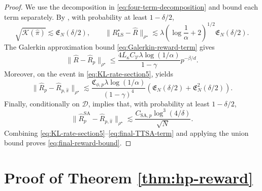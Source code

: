 \documentclass{article}
\theoremstyle{definition}
\theoremstyle{remark}
\theoremstyle{plain}
\newcommand{\dsieve}{p}
\numberwithin{equation}{section}
\begin{document}
\begin{proof}
We use the decomposition in \eqref{eq:four-term-decomposition} and bound each term separately.
By , with probability at least \(1-\delta/2\),
\begin{equation}
\label{eq:KL-rate-section5}
    \sqrt{\mathcal K(\widehat\pi)}
    \lesssim
    \mathfrak E_N(\delta/2),
    \qquad
    \|R_{\mathrm{LS}}^\star-\widehat R\|_{\rho^\star}
    \lesssim
    \lambda
    \left(\log\frac1\alpha+2\right)^{1/2}
    \mathfrak E_N(\delta/2).
\end{equation}
The Galerkin approximation bound \eqref{eq:Galerkin-reward-term} gives
\begin{equation}
\label{eq:final-Galerkin-term}
    \|\widehat R-\widehat R_\dsieve\|_{\rho^\star}
    \leq
    \frac{
        4L_{\kappa} C_{\mathcal V}
        \lambda\log(1/\alpha)
    }{1-\gamma}
    \dsieve^{-\beta/d}.
\end{equation}
Moreover, on the event in \eqref{eq:KL-rate-section5},
 yields
\begin{equation}
\label{eq:final-plugin-term}
    \|\widehat R_\dsieve-\widehat R_{\dsieve,\widehat\pi}\|_{\rho^\star}
    \lesssim
    \frac{
        \mathfrak C_{\phi,\dsieve}
        \lambda\log(1/\alpha)
    }{(1-\gamma)^4}
    \left(
        \mathfrak E_N(\delta/2)
        +
        \mathfrak E_N^2(\delta/2)
    \right).
\end{equation}
Finally, conditionally on \(\mathcal D\),  implies
that, with probability at least \(1-\delta/2\),
\begin{equation}
\label{eq:final-TTSA-term}
    \|\widehat R_{\dsieve}^{\mathrm{SA}}
      -\widehat R_{\dsieve,\widehat\pi}\|_{\rho^\star}
    \lesssim
    \frac{
        C_{\mathrm{SA},\dsieve}
        \log^3(4/\delta)
    }{\sqrt N}.
\end{equation}
Combining
\eqref{eq:KL-rate-section5}--\eqref{eq:final-TTSA-term}
and applying the union bound proves \eqref{eq:final-reward-bound}.
\end{proof}





\appendix

\section{Proof of Theorem \ref{thm:hp-reward}}
\label{app:proof-oracle}
\end{document}

